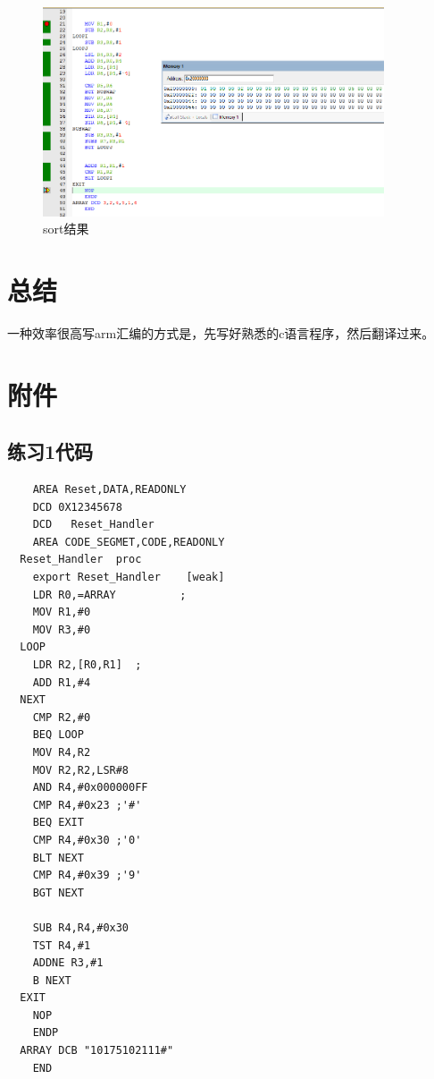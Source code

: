 \documentclass[a4paper,10pt,UTF8]{paper}
\numberwithin{equation}{section}
\numberwithin{figure}{section}
\begin{document}
\begin{figure}[h]
  \centering
  \includegraphics[width=0.9\textwidth]{3.PNG}
  \caption{sort结果}
  \label{fig:3}
\end{figure}

\section{总结}

一种效率很高写arm汇编的方式是，先写好熟悉的c语言程序，然后翻译过来。

\section{附件}

\subsection{练习1代码}
\begin{verbatim}
    AREA Reset,DATA,READONLY
    DCD 0X12345678
    DCD   Reset_Handler
    AREA CODE_SEGMET,CODE,READONLY
  Reset_Handler  proc
    export Reset_Handler    [weak]
    LDR R0,=ARRAY          ;
    MOV R1,#0              
    MOV R3,#0
  LOOP
    LDR R2,[R0,R1]  ;
    ADD R1,#4        
  NEXT
    CMP R2,#0
    BEQ LOOP
    MOV R4,R2
    MOV R2,R2,LSR#8             
    AND R4,#0x000000FF   
    CMP R4,#0x23 ;'#'
    BEQ EXIT
    CMP R4,#0x30 ;'0'
    BLT NEXT
    CMP R4,#0x39 ;'9'
    BGT NEXT

    SUB R4,R4,#0x30
    TST R4,#1
    ADDNE R3,#1
    B NEXT   
  EXIT
    NOP
    ENDP
  ARRAY DCB "10175102111#"
    END

\end{verbatim}
\end{document}
